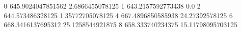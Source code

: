 0 645.9024047851562 2.6866455078125
1 643.2157592773438 0.0
2 644.573486328125 1.35772705078125
4 667.4896850585938 24.27392578125
6 668.3416137695312 25.1258544921875
8 658.333740234375 15.11798095703125
